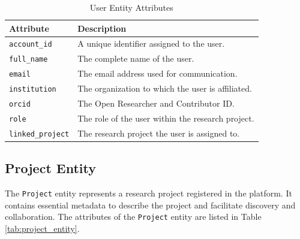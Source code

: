 \documentclass{article}
\begin{document}
\begin{table}[h]
      \centering
      \renewcommand{\arraystretch}{1.2}
      \caption{User Entity Attributes}
      \label{tab:user_entity}
      \begin{tabularx}{\textwidth}{|l|X|}
            \hline
            \textbf{Attribute}       & \textbf{Description}                              \\ \hline
            \texttt{account\_id}     & A unique identifier assigned to the user.         \\ \hline
            \texttt{full\_name}      & The complete name of the user.                    \\ \hline
            \texttt{email}           & The email address used for communication.         \\ \hline
            \texttt{institution}     & The organization to which the user is affiliated. \\ \hline
            \texttt{orcid}           & The Open Researcher and Contributor ID.           \\ \hline
            \texttt{role}            & The role of the user within the research project. \\ \hline
            \texttt{linked\_project} & The research project the user is assigned to.     \\ \hline
      \end{tabularx}
\end{table}


\subsection{Project Entity}
The \texttt{Project} entity represents a research project registered in the platform. It contains essential metadata to describe the project and facilitate discovery and collaboration. The attributes of the \texttt{Project} entity are listed in Table \ref{tab:project_entity}.
\end{document}
